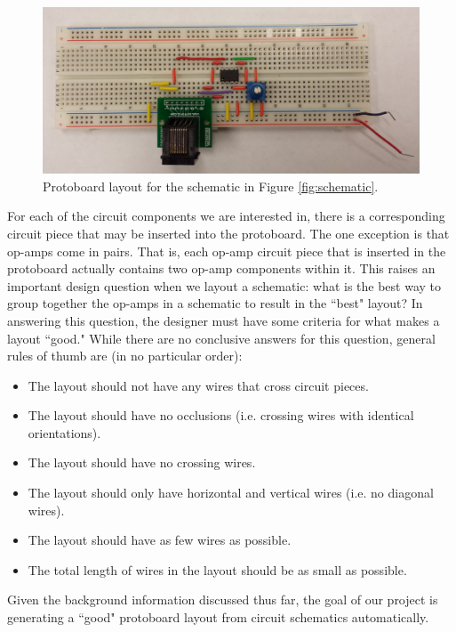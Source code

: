\begin{figure}
\begin{center}
\includegraphics[width=\textwidth]{Images/sample_physical_layout.jpg}
\caption{Protoboard layout for the schematic in Figure \ref{fig:schematic}.}
\label{fig:eg_s_to_pb}
\end{center}
\end{figure}

For each of the circuit components we are interested in, there is a corresponding
circuit piece that may be inserted into the protoboard. The one exception is that
op-amps come in pairs. That is, each op-amp circuit piece that is inserted in the
protoboard actually contains two op-amp components within it. This raises an
important design question when we layout a schematic: what is the best way to
group together the op-amps in a schematic to result in the ``best" layout? In
answering this question, the designer must have some criteria for what makes a
layout ``good." While there are no conclusive answers for this question,
general rules of thumb are (in no particular order):

\begin{itemize}
\item The layout should not have any wires that cross circuit pieces.
\item The layout should have no occlusions (i.e. crossing wires with identical
orientations).
\item The layout should have no crossing wires.
\item The layout should only have horizontal and vertical wires (i.e. no
diagonal wires).
\item The layout should have as few wires as possible.
\item The total length of wires in the layout should be as small as possible.
\end{itemize}

Given the background information discussed thus far, the goal of our project is
generating a ``good" protoboard layout from circuit schematics automatically.

